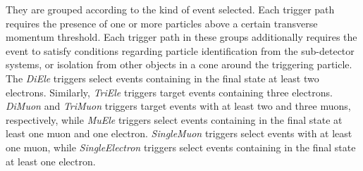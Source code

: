 They are grouped according to the kind of event selected.
Each trigger path requires the presence of one or more particles above a certain transverse momentum threshold.
Each trigger path in these groups additionally requires the event to satisfy conditions regarding particle identification from the sub-detector systems,
or isolation from other objects in a cone around the triggering particle.
The \textit{DiEle} triggers select events containing in the final state at least two electrons.
Similarly, \textit{TriEle} triggers target events containing three electrons.
\textit{DiMuon} and \textit{TriMuon} triggers target events with at least two and three muons, respectively,
while \textit{MuEle} triggers select events containing in the final state at least one muon and one electron.
\textit{SingleMuon} triggers select events with at least one muon,
while \textit{SingleElectron} triggers select events containing in the final state at least one electron.
